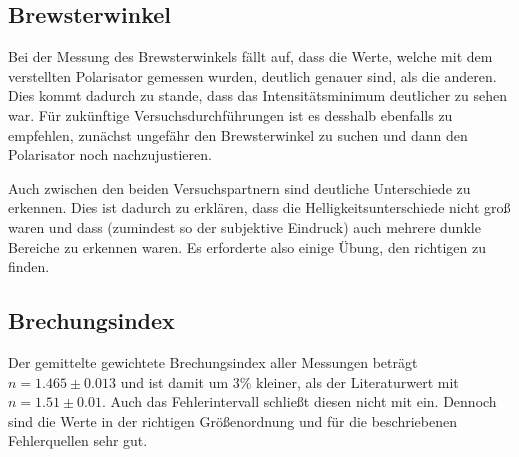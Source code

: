 \documentclass[12pt,a4paper,titlepage,headinclude,bibtotoc]{scrartcl}
\begin{document}
\subsection{Brewsterwinkel}
Bei der Messung des Brewsterwinkels fällt auf, dass die Werte, welche mit dem verstellten Polarisator gemessen wurden, deutlich genauer sind, als die anderen.
Dies kommt dadurch zu stande, dass das Intensitätsminimum deutlicher zu sehen war.
Für zukünftige Versuchsdurchführungen ist es desshalb ebenfalls zu empfehlen, zunächst ungefähr den Brewsterwinkel zu suchen und dann den Polarisator noch nachzujustieren.

Auch zwischen den beiden Versuchspartnern sind deutliche Unterschiede zu erkennen.
Dies ist dadurch zu erklären, dass die Helligkeitsunterschiede nicht groß waren und dass (zumindest so der subjektive Eindruck) auch mehrere dunkle Bereiche zu erkennen waren.
Es erforderte also einige Übung, den richtigen zu finden.


\subsection{Brechungsindex}
Der gemittelte gewichtete Brechungsindex aller Messungen beträgt $n = 1.465 \pm 0.013$ und ist damit um $3 \%$ kleiner, als der Literaturwert mit $n=1.51\pm 0.01$.
Auch das Fehlerintervall schließt diesen nicht mit ein.
Dennoch sind die Werte in der richtigen Größenordnung und für die beschriebenen Fehlerquellen sehr gut.



 
 
\end{document}
